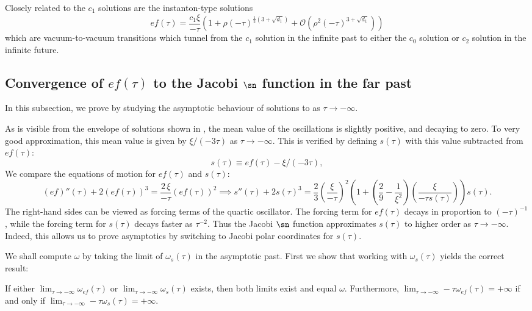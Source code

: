 Closely related to the $c_{1}$ solutions are the instanton-type solutions 
\begin{equation}
ef(\tau)=\frac{c_{1}\xi}{-\tau}\left(1+\rho\left(-\tau\right)^{\tfrac{1}{2}\left(3+\sqrt{d_{1}}\right)}+\mathcal{O}\left(\rho^{2}\left(-\tau\right)^{3+\sqrt{d_{1}}}\right)\right)\label{eq:instanton-type}
\end{equation}
 which are vacuum-to-vacuum transitions which tunnel from the $c_{1}$ solution in the infinite past to either the $c_{0}$ solution or $c_{2}$ solution in the infinite future.

\subsection{\label{app:pf-approx-w}Convergence of \texorpdfstring{$ef(\tau)$}{ef(\tau)} to the Jacobi \texorpdfstring{$\sn$}{sn} function in the far past}

In this subsection, we prove  by studying the asymptotic behaviour of solutions to  as $\tau\to-\infty$. 

As is visible from the envelope of solutions shown in , the mean value of the oscillations is slightly positive, and decaying to zero. To very good approximation, this mean value is given by $\xi/(-3\tau)$ as $\tau\to-\infty$. This is verified by defining $s(\tau)$ with this value subtracted from $ef(\tau)$: 
\begin{equation}
s(\tau)\equiv ef(\tau)-\xi/(-3\tau),\label{eq:def-s}
\end{equation}
 We compare the equations of motion for $ef(\tau)$ and $s(\tau)$: 
\begin{equation}
(ef)''(\tau)+2\left(ef(\tau)\right)^{3}=\frac{2\,\xi}{-\tau}(ef(\tau))^{2}\implies s''(\tau)+2s(\tau)^{3}=\frac{2}{3}\left(\frac{\xi}{-\tau}\right)^{2}\left(1+\left(\frac{2}{9}-\frac{1}{\xi^{2}}\right)\left(\frac{\xi}{-\tau s(\tau)}\right)\right)s(\tau).\label{eq:s-eom}
\end{equation}
The right-hand sides can be viewed as forcing terms of the quartic oscillator. The forcing term for $ef(\tau)$ decays in proportion to $(-\tau)^{-1}$, while the forcing term for $s(\tau)$ decays faster as $\tau^{-2}$. Thus the Jacobi $\sn$ function approximates $s(\tau)$ to higher order as $\tau\to-\infty$. Indeed, this allows us to prove asymptotics by switching to Jacobi polar coordinates for $s(\tau)$. 

We shall compute $\omega$ by taking the limit of $\omega_{s}(\tau)$ in the asymptotic past. First we show that working with $\omega_{s}(\tau)$ yields the correct result:
\begin{lem}
\label{lem:omega-ef-equivalent-to-omega-s}If either $\lim_{\tau\to-\infty}\omega_{ef}(\tau)$ or $\lim_{\tau\to-\infty}\omega_{s}(\tau)$ exists, then both limits exist and equal $\omega$. Furthermore, $\lim_{\tau\to-\infty}-\tau\omega_{ef}(\tau)=+\infty$ if and only if $\lim_{\tau\to-\infty}-\tau\omega_{s}(\tau)=+\infty$. 
\end{lem}

